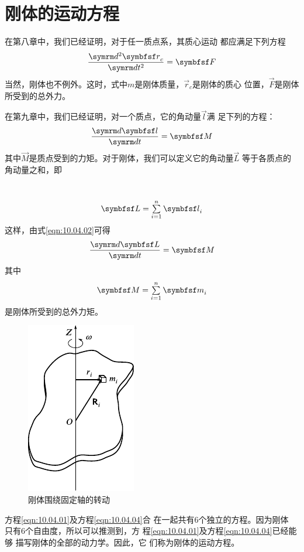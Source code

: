 \section{刚体的运动方程}

在第八章中，我们已经证明，对于任一质点系，其质心运动
都应满足下列方程
\begin{equation}\label{eqn:10.04.01}
    \frac { \dif ^ { 2 } \vec{r} _ { c } } { \dif t ^ { 2 } } = \vec{F}
\end{equation}
当然，刚体也不例外。这时，式中$ m $是刚体质量，$ \vec{r} _ { c } $是刚体的质心
位置，$ \vec{F} $是刚体所受到的总外力。

在第九章中，我们已经证明，对一个质点，它的角动量$ \vec{l} $满
足下列的方程：
\begin{equation}\label{eqn:10.04.02}
    \frac {  \dif \vec{l} } {  \dif t } = \vec{M}
\end{equation}
其中$\vec{M}$是质点受到的力矩。对于刚体，我们可以定义它的角动量$ \vec{L} $
等于各质点的角动量之和，即

~\vspace{-2.56em}
\begin{equation}\label{eqn:10.04.03}
    \vec{L} = \sumx_{ i = 1 } ^ n \vec{l} _ i
\end{equation}
这样，由式\eqref{eqn:10.04.02}可得
\begin{equation}\label{eqn:10.04.04}
    \frac {  \dif \vec{L} } {  \dif t } = \vec{M }
\end{equation}
其中\vspace{-1.56em}
\begin{equation}\label{eqn:10.04.05}
    \vec{M} = \sumx_{ i = 1 } ^ n \vec{m} _ { i }
\end{equation}
是刚体所受到的总外力矩。

\begin{figure}
    \vspace{-3em}
    \centering
    \includegraphics{figure/fig10.12}
    \caption{刚体围绕固定轴的转动}
    \label{fig:10.12}
\end{figure}
方程\eqref{eqn:10.04.01}及方程\eqref{eqn:10.04.04}合
在一起共有$ 6 $个独立的方程。因为刚体
只有$ 6 $个自由度，所以可以推测到，方
程\eqref{eqn:10.04.01}及方程\eqref{eqn:10.04.04}已经能够
描写刚体的全部的动力学。因此，它
们称为刚体的运动方程。

